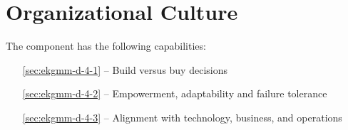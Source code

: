\chapter{Organizational Culture}\label{ch:ekgmm-d-4}

The  component has the following capabilities:

\begin{itemize}[leftmargin=.5in]
  \item [\ref{sec:ekgmm-d-4-1}]  -- Build versus buy decisions
  \item [\ref{sec:ekgmm-d-4-2}]  -- Empowerment, adaptability and failure tolerance
  \item [\ref{sec:ekgmm-d-4-3}]  -- Alignment with technology, business, and operations
\end{itemize}





